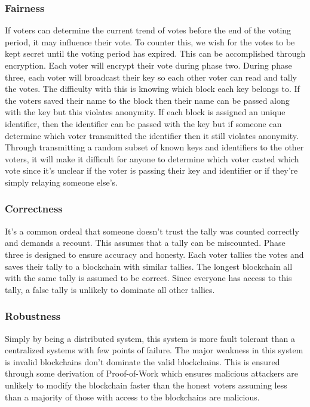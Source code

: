 \documentclass[conference]{IEEEtran}
\begin{document}
\subsubsection{Fairness}
If voters can determine the current trend of votes before the end of the voting period, it may influence their vote. To counter this, we wish for the votes to be kept secret until the voting period has expired. This can be accomplished through encryption. Each voter will encrypt their vote during phase two. During phase three, each voter will broadcast their key so each other voter can read and tally the votes. The difficulty with this is knowing which block each key belongs to. If the voters saved their name to the block then their name can be passed along with the key but this violates anonymity. If each block is assigned an unique identifier, then the identifier can be passed with the key but if someone can determine which voter transmitted the identifier then it still violates anonymity. Through transmitting a random subset of known keys and identifiers to the other voters, it will make it difficult for anyone to determine which voter casted which vote since it's unclear if the voter is passing their key and identifier or if they're simply relaying someone else's.

\subsubsection{Correctness}
It's a common ordeal that someone doesn't trust the tally was counted correctly and demands a recount. This assumes that a tally can be miscounted. Phase three is designed to ensure accuracy and honesty. Each voter tallies the votes and saves their tally to a blockchain with similar tallies. The longest blockchain all with the same tally is assumed to be correct. Since everyone has access to this tally, a false tally is unlikely to dominate all other tallies. 

\subsubsection{Robustness}
Simply by being a distributed system, this system is more fault tolerant than a centralized systems with few points of failure. The major weakness in this system is invalid blockchains don't dominate the valid blockchains. This is ensured through some derivation of Proof-of-Work which ensures malicious attackers are unlikely to modify the blockchain faster than the honest voters assuming less than a majority of those with access to the blockchains are malicious. 
\end{document}

